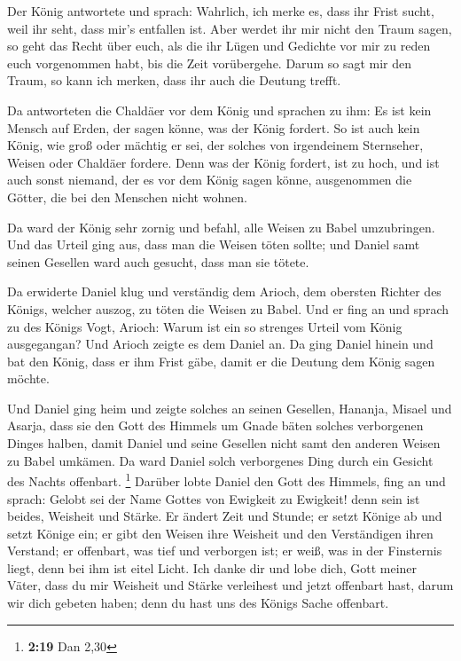  Der König antwortete und sprach: Wahrlich, ich merke es,
dass ihr Frist sucht, weil ihr seht, dass mir's entfallen ist.
 Aber werdet ihr mir nicht den Traum sagen, so geht das
Recht über euch, als die ihr Lügen und Gedichte vor mir zu reden euch
vorgenommen habt, bis die Zeit vorübergehe. Darum so sagt mir den Traum,
so kann ich merken, dass ihr auch die Deutung trefft.

 Da antworteten die Chaldäer vor dem König und sprachen zu
ihm: Es ist kein Mensch auf Erden, der sagen könne, was der König
fordert. So ist auch kein König, wie groß oder mächtig er sei, der
solches von irgendeinem Sternseher, Weisen oder Chaldäer fordere.
 Denn was der König fordert, ist zu hoch, und ist auch
sonst niemand, der es vor dem König sagen könne, ausgenommen die Götter,
die bei den Menschen nicht wohnen.

 Da ward der König sehr zornig und befahl, alle Weisen zu
Babel umzubringen.  Und das Urteil ging aus, dass man die
Weisen töten sollte; und Daniel samt seinen Gesellen ward auch gesucht,
dass man sie tötete.

 Da erwiderte Daniel klug und verständig dem Arioch, dem
obersten Richter des Königs, welcher auszog, zu töten die Weisen zu
Babel.  Und er fing an und sprach zu des Königs Vogt,
Arioch: Warum ist ein so strenges Urteil vom König ausgegangan? Und
Arioch zeigte es dem Daniel an.  Da ging Daniel hinein und
bat den König, dass er ihm Frist gäbe, damit er die Deutung dem König
sagen möchte.

 Und Daniel ging heim und zeigte solches an seinen
Gesellen, Hananja, Misael und Asarja,  dass sie den Gott
des Himmels um Gnade bäten solches verborgenen Dinges halben, damit
Daniel und seine Gesellen nicht samt den anderen Weisen zu Babel
umkämen.  Da ward Daniel solch verborgenes Ding durch ein
Gesicht des Nachts offenbart. \footnote{\textbf{2:19} Dan 2,30}
 Darüber lobte Daniel den Gott des Himmels, fing an und
sprach: Gelobt sei der Name Gottes von Ewigkeit zu Ewigkeit! denn sein
ist beides, Weisheit und Stärke.  Er ändert Zeit und
Stunde; er setzt Könige ab und setzt Könige ein; er gibt den Weisen ihre
Weisheit und den Verständigen ihren Verstand;  er
offenbart, was tief und verborgen ist; er weiß, was in der Finsternis
liegt, denn bei ihm ist eitel Licht.  Ich danke dir und
lobe dich, Gott meiner Väter, dass du mir Weisheit und Stärke verleihest
und jetzt offenbart hast, darum wir dich gebeten haben; denn du hast uns
des Königs Sache offenbart.

